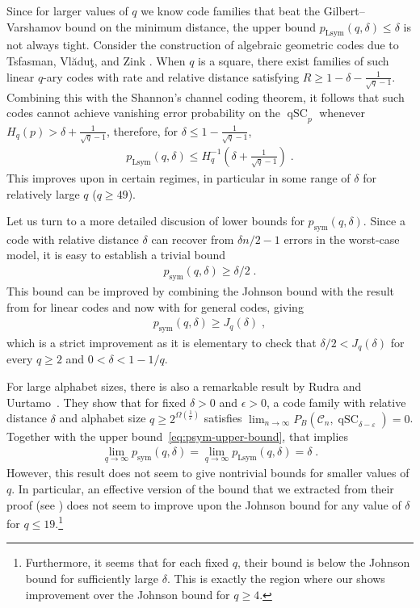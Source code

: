 \documentclass{article}
\newcommand{\eps}{\varepsilon}
\DeclareMathOperator{\qSC}{qSC}
\newcommand{\cC}{\mathcal{C}}
\newcommand{\psym}{p_{\mathrm{sym}}}
\newcommand{\pLsym}{p_{\mathrm{Lsym}}}
\theoremstyle{plain}
\theoremstyle{plain}
\theoremstyle{plain}
\theoremstyle{plain}
\theoremstyle{plain}
\theoremstyle{plain}
\theoremstyle{plain}
\theoremstyle{plain}
\theoremstyle{plain}
\theoremstyle{plain}
\theoremstyle{remark}
\theoremstyle{remark}
\theoremstyle{remark}
\theoremstyle{plain}
\begin{document}
Since for larger values of $q$ we know
code families that beat the Gilbert--Varshamov bound on the minimum distance,
the upper bound $\pLsym(q,\delta)\le\delta$ is not always
tight. Consider the construction of
algebraic geometric codes due to Tsfasman, Vl{\u{a}}duţ, and Zink  \cite{tsfasman1982modular,ihara1981some,couvreur2021algebraic}. When $q$ is a square, there exist families of such linear $q$-ary codes with rate and relative distance satisfying $R\ge 1-\delta-\frac{1}{\sqrt{q}-1}$. Combining this with the Shannon's channel coding theorem, it follows that such codes cannot achieve vanishing error probability on the $\qSC_p$ whenever $H_q(p)>\delta+\frac{1}{\sqrt{q}-1}$, therefore, for $\delta\le 1-\frac{1}{\sqrt{q}-1}$,
\begin{align*}
    \pLsym(q, \delta)\le H_q^{-1}\left(\delta+\frac{1}{\sqrt{q}-1}\right)\;.
\end{align*}
This improves upon  in certain regimes, in particular in some range of $\delta$ for relatively large $q$  ($q\ge 49$).


Let us turn to a more detailed discusion of lower bounds for $\psym(q,\delta)$.
Since a code with relative distance $\delta$ can recover from
$\delta n/2-1$ errors in the worst-case model, it is easy to establish
a trivial bound
\begin{align*}
    \psym(q,\delta)\ge \delta/2\;.
\end{align*}
This bound can be improved by combining
the Johnson bound with the result
from \cite{pernice2025list}
for linear codes and
now with 
for general codes, giving
\begin{align*}
\psym(q,\delta)\ge J_q(\delta)\;,
\end{align*}
which is a strict improvement
as it is elementary to check
that $\delta/2< J_q(\delta)$
for every $q\ge 2$ and $0<\delta< 1-1/q$.

For large alphabet sizes, there is also a remarkable result
by Rudra and Uurtamo~\cite{rudra2010two}.
They show that for fixed $\delta>0$ and $\epsilon>0$, 
a code family with relative distance $\delta$ and alphabet
size $q\ge 2^{\Omega(\frac{1}{\varepsilon})}$
satisfies $\lim_{n\to\infty}P_B(\cC_n,\qSC_{\delta-\eps})=0$.
Together with the upper bound~\eqref{eq:psym-upper-bound},
that implies
\begin{align*}
\lim_{q\to\infty}\psym(q,\delta)=\lim_{q\to\infty}\pLsym(q,\delta)=\delta\;.
\end{align*}
However, this result does not seem to give nontrivial bounds for
smaller values of $q$. In particular, 
an effective version of the bound that we extracted from their proof
(see )
does not seem to improve upon the Johnson
bound for any value of $\delta$ for $q\le 19$.\footnote{
Furthermore, it seems that for each fixed $q$, their bound
is below the Johnson bound for sufficiently large $\delta$.
This is exactly the region where our  shows improvement
over the Johnson bound for $q\ge 4$.
}
\end{document}
